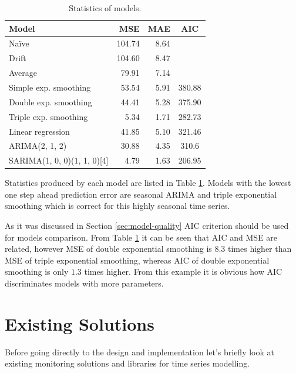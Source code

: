     \begin{table}[h]
        \begin{center}
            \begin{tabular}{l|r|r|c}
                    \textbf{Model} & \textbf{MSE} & \textbf{MAE} & \textbf{AIC} \\ \hline \hline
                    Na\"{i}ve & 104.74 & 8.64 & \\
                    Drift & 104.60 & 8.47 & \\
                    Average & 79.91 & 7.14 & \\ \hline
                    Simple exp. smoothing & 53.54 & 5.91 & 380.88 \\
                    Double exp. smoothing & 44.41 & 5.28 & 375.90 \\
                    Triple exp. smoothing & 5.34 & 1.71 & 282.73 \\ \hline
                    Linear regression & 41.85 & 5.10 & 321.46 \\ \hline
                    ARIMA(2, 1, 2) & 30.88 & 4.35 & 310.6 \\
                    SARIMA(1, 0, 0)(1, 1, 0)[4] & 4.79 & 1.63 & 206.95 \\
            \end{tabular}
            \caption{Statistics of models.}
            \label{tab:models-stat}
        \end{center}
    \end{table}

    Statistics produced by each model are listed in Table \ref{tab:models-stat}. Models with the lowest one
    step ahead prediction error are seasonal ARIMA and triple exponential smoothing which is correct for this highly
    seasonal time series.

    As it was discussed in Section \ref{sec:model-quality} AIC criterion should be used for models comparison. From
    Table \ref{tab:models-stat} it can be seen that AIC and MSE are related, however MSE of double exponential smoothing
    is $8.3$ times higher than MSE of triple exponential smoothing, whereas AIC of double exponential smoothing is
    only $1.3$ times higher. From this example it is obvious how AIC discriminates models with more parameters.

\chapter{Existing Solutions}
Before going directly to the design and implementation let's briefly look at existing monitoring solutions and libraries
for time series modelling.

